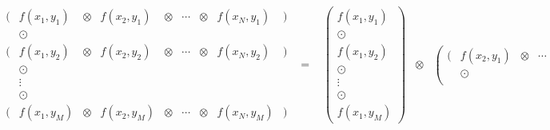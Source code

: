 \documentclass{article}
\begin{document}
\begin{figure}
  \begin{eqnarray*}
    \begin{array}{ccccccccc}
      \scriptstyle ( \!\!\!&\scriptstyle\!\!\! f(x_1,y_1) \!\!\!&\scriptstyle\!\!\! \otimes \!\!\!&\scriptstyle\!\!\! f(x_2,y_1) \!\!\!&\scriptstyle\!\!\! \otimes \!\!\!&\scriptstyle\!\!\! \cdots \!\!\!&\scriptstyle\!\!\! \otimes \!\!\!&\scriptstyle\!\!\! f(x_N,y_1) \!\!\!&\scriptstyle\!\!\! ) \\
      &\scriptstyle \odot \\
      \scriptstyle ( \!\!\!&\scriptstyle\!\!\! f(x_1,y_2) \!\!\!&\scriptstyle\!\!\! \otimes \!\!\!&\scriptstyle\!\!\! f(x_2,y_2) \!\!\!&\scriptstyle\!\!\! \otimes \!\!\!&\scriptstyle\!\!\! \cdots \!\!\!&\scriptstyle\!\!\! \otimes \!\!\!&\scriptstyle\!\!\! f(x_N,y_2) \!\!\!&\scriptstyle\!\!\! ) \\
      &\scriptstyle \odot \\
      &\scriptstyle \vdots \\
      &\scriptstyle \odot \\
      \scriptstyle ( \!\!\!&\scriptstyle\!\!\! f(x_1,y_M) \!\!\!&\scriptstyle\!\!\! \otimes \!\!\!&\scriptstyle\!\!\! f(x_2,y_M) \!\!\!&\scriptstyle\!\!\! \otimes \!\!\!&\scriptstyle\!\!\! \cdots \!\!\!&\scriptstyle\!\!\! \otimes \!\!\!&\scriptstyle\!\!\! f(x_N,y_M) \!\!\!&\scriptstyle\!\!\! )
    \end{array}
    & = &
    \begin{array}{ccc}
      \left( \begin{array}{c}
	\scriptstyle \!\!\!f(x_1,y_1)\!\!\! \\
	\scriptstyle \odot \\
	\scriptstyle \!\!\!f(x_1,y_2)\!\!\! \\
	\scriptstyle \odot \\
	\scriptstyle \vdots \\
	\scriptstyle \odot \\
	\scriptstyle \!\!\!f(x_1,y_M)\!\!\!
      \end{array} \right)
      \!\!\!&\scriptstyle\!\!\! \otimes \!\!\!&\!\!\!
      \left( \begin{array}{ccccccc}
	\scriptstyle ( \!\!\!&\scriptstyle\!\!\! f(x_2,y_1) \!\!\!&\scriptstyle\!\!\! \otimes \!\!\!&\scriptstyle\!\!\! \cdots \!\!\!&\scriptstyle\!\!\! \otimes \!\!\!&\scriptstyle\!\!\! f(x_N,y_1) \!\!\!&\scriptstyle\!\!\! ) \\
	&\scriptstyle \odot \\

\end{array}
\end{array}
\end{eqnarray*}
\end{figure}
\end{document}
